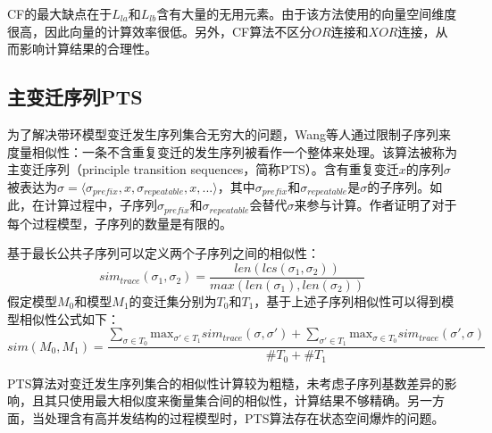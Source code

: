 CF的最大缺点在于$L_{la}$和$L_{lb}$含有大量的无用元素\cite{dijkman2011similarity,van2008measuring}。由于该方法使用的向量空间维度很高，因此向量的计算效率很低。另外，CF算法不区分$OR$连接和$XOR$连接，从而影响计算结果的合理性。

\subsection{主变迁序列PTS}\label{subsec:pts}
为了解决带环模型变迁发生序列集合无穷大的问题，Wang等人通过限制子序列来度量相似性：一条不含重复变迁的发生序列被看作一个整体来处理\cite{wang2010behavioral}。该算法被称为主变迁序列（principle transition sequences，简称PTS）。含有重复变迁$x$的序列$\sigma$被表达为$\sigma=\langle\sigma_{prefix},x,\sigma_{repeatable},x,...\rangle$，其中$\sigma_{prefix}$和$\sigma_{repeatable}$是$\sigma$的子序列。如此，在计算过程中，子序列$\sigma_{prefix}$和$\sigma_{repeatable}$会替代$\sigma$来参与计算。作者证明了对于每个过程模型，子序列的数量是有限的。

基于最长公共子序列可以定义两个子序列之间的相似性：
\begin{displaymath}
  sim_{trace}(\sigma_{1},\sigma_{2})=\frac{len(lcs(\sigma_{1},\sigma_{2}))}{max(len(\sigma_{1}),len(\sigma_{2}))}
\end{displaymath}
假定模型$M_{0}$和模型$M_{1}$的变迁集分别为$T_{0}$和$T_{1}$，基于上述子序列相似性可以得到模型相似性公式如下：
\begin{displaymath}
  sim(M_{0},M_{1})=\frac{\sum_{\sigma\in T_{0}}\text{max}_{\sigma'\in T_{1}}sim_{trace}(\sigma,\sigma')+\sum_{\sigma'\in T_{1}}\text{max}_{\sigma\in T_{0}}sim_{trace}(\sigma',\sigma)}{\#T_{0}+\#T_{1}}
\end{displaymath}

PTS算法对变迁发生序列集合的相似性计算较为粗糙，未考虑子序列基数差异的影响，且其只使用最大相似度来衡量集合间的相似性，计算结果不够精确。另一方面，当处理含有高并发结构的过程模型时，PTS算法存在状态空间爆炸的问题。

